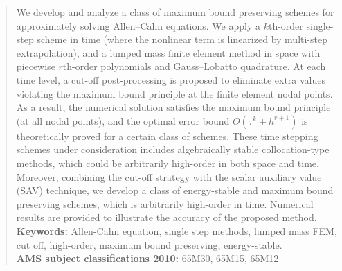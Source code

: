 \documentclass[10pt,final,leqno,onefignum,onetabnum]{siamltex}%
\begin{document}
\begin{abstract}
We develop and analyze a class of maximum bound preserving schemes for approximately solving Allen--Cahn equations.
We apply a $k$th-order single-step scheme in time (where the nonlinear term is linearized by multi-step extrapolation),
and  a lumped mass finite element method in space with piecewise
$r$th-order polynomials and Gauss--Lobatto quadrature. At each time level, a cut-off post-processing
is proposed to eliminate extra values violating the maximum bound principle at the finite element nodal points.
As a result, the numerical solution satisfies the maximum bound principle (at all nodal points),
and the optimal error bound $O(\tau^k+h^{r+1})$ is theoretically proved for a certain class of schemes.
These time stepping schemes under consideration includes algebraically stable collocation-type methods,
which could be arbitrarily high-order in both space and time.
Moreover, combining the cut-off strategy with the scalar auxiliary value (SAV) technique,
we develop a class of energy-stable and maximum bound preserving schemes, which is arbitrarily high-order in time.
Numerical results are provided to illustrate the accuracy of the proposed method.\\

{\bf Keywords:} Allen-Cahn equation, single step methods, lumped mass FEM, cut off,
high-order, maximum bound preserving, energy-stable.\\


{\bf AMS subject classifications 2010:}
65M30, 65M15, 65M12
\end{abstract}
\end{document}
